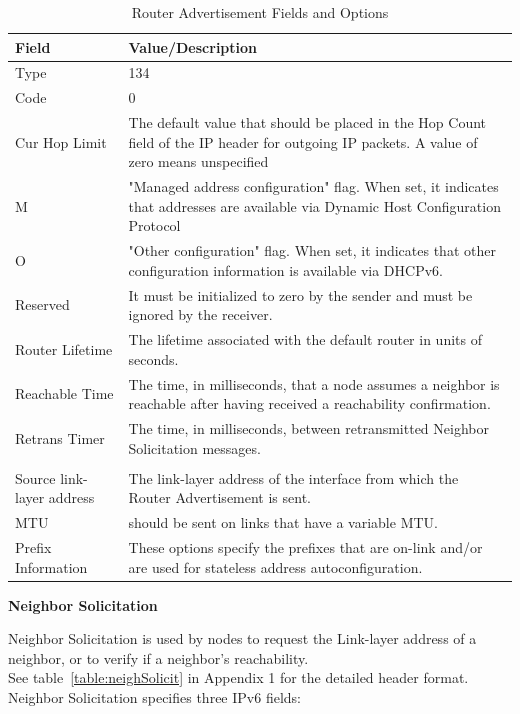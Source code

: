 \documentclass[12pt]{article}
\begin{document}
\begin{savenotes}
\begin{table}[h]
\centering
\addtolength{\tabcolsep}{3pt}
\begin{tabular}{|L{3.0cm}|L{11.6cm}|}
\hline
Field&Value/Description\\
\hline
Type&134\\
\hline
Code&0\\
\hline
Cur Hop Limit&The default value that should be placed in the Hop Count field of the IP header for outgoing IP packets. A value of zero means unspecified\\
\hline
M&"Managed address configuration" flag. When set, it indicates that addresses are available via Dynamic Host Configuration Protocol\\
\hline
O&"Other configuration" flag. When set, it indicates that other configuration information is available via DHCPv6.\\
\hline
Reserved&It must be initialized to zero by the sender and must be ignored by the receiver.\\
\hline
Router Lifetime&The lifetime associated with the default router in units of seconds.\\
\hline
Reachable Time&The time, in milliseconds, that a node assumes a neighbor is reachable after having received a reachability confirmation.\\
\hline
Retrans Timer&The time, in milliseconds, between retransmitted Neighbor Solicitation messages.\\
\hline
{}
\\
\hline
Source link-layer address &The link-layer address of the interface from which the Router Advertisement is sent.\\
\hline
MTU&should be sent on links that have a variable MTU.\\
\hline
Prefix Information&These options specify the prefixes that are on-link and/or are used for stateless address autoconfiguration.\\
\hline
\end{tabular}
\caption{Router Advertisement Fields and Options}
\label{table:routerAdvfields}
\end{table}
\end{savenotes}

\textbf{Neighbor Solicitation}

Neighbor Solicitation is used by nodes to request the Link-layer address of a neighbor, or to verify if a neighbor's reachability.\\
See table~\ref{table:neighSolicit} in Appendix 1 for the detailed header format.\\
Neighbor Solicitation specifies three IPv6 fields:
\end{document}
